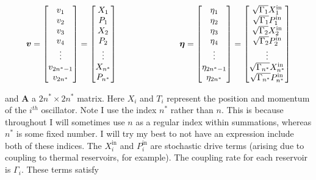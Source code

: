 \documentclass[12pt]{article}
\newcommand{\bv}[1]{\boldsymbol{#1}}
\begin{document}
\begin{align}
\bv{v} =
\begin{bmatrix}
v_1\\
v_2\\
v_3\\
v_4\\
\vdots\\
v_{2n^*-1}\\
v_{2n^*}
\end{bmatrix}
=
\begin{bmatrix}
X_1\\
P_1\\
X_2\\
P_2\\
\vdots\\
X_{n^*}\\
P_{n^*}
\end{bmatrix}
\hspace{1 in}
\bv{\eta} =
\begin{bmatrix}
\eta_1\\
\eta_2\\
\eta_3\\
\eta_4\\
\vdots\\
\eta_{2n^*-1}\\
\eta_{2n^*}
\end{bmatrix}
=
\begin{bmatrix}
\sqrt{\Gamma_1}X^{\text{in}}_1\\
\sqrt{\Gamma_1}P^{\text{in}}_1\\
\sqrt{\Gamma_2}X^{\text{in}}_2\\
\sqrt{\Gamma_2}P^{\text{in}}_2\\
\vdots\\
\sqrt{\Gamma_{n^*}}X^{\text{in}}_{n^*}\\
\sqrt{\Gamma_{n^*}}P^{\text{in}}_{n^*}
\end{bmatrix}
\end{align}

and $\bv{A}$ a $2n^* \times 2n^*$ matrix.
Here $X_i$ and $T_i$ represent the position and momentum of the $i^{th}$ oscillator. Note I use the index $n^*$ rather than $n$. This is because throughout I will sometimes use $n$ as a regular index within summations, whereas $n^*$ is some fixed number. I will try my best to not have an expression include both of these indices.
The $X_i^{\text{in}}$ and $P_i^{\text{in}}$ are stochastic drive terms (arising due to coupling to thermal reservoirs, for example). The coupling rate for each reservoir is $\Gamma_i$. These terms satisfy
\end{document}
